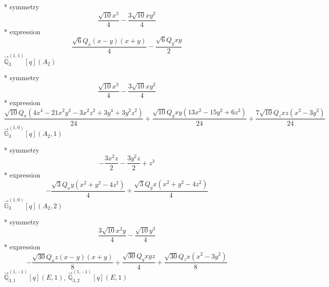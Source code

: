\documentclass[fleqn,8pt]{jsarticle}
\begin{document}
\noindent\quad ** symmetry
\begin{dmath*}
\frac{\sqrt{10} x^{3}}{4} - \frac{3 \sqrt{10} x y^{2}}{4}
\end{dmath*}
\noindent\quad ** expression
\begin{dmath*}
\frac{\sqrt{6} Q_{x} \left(x - y\right) \left(x + y\right)}{4} - \frac{\sqrt{6} Q_{y} x y}{2}
\end{dmath*}
\noindent\quad $\vec{\mathbb{Q}}_{3}^{(1,1)}[q](A_{2})$

\noindent\quad ** symmetry
\begin{dmath*}
\frac{\sqrt{10} x^{3}}{4} - \frac{3 \sqrt{10} x y^{2}}{4}
\end{dmath*}
\noindent\quad ** expression
\begin{dmath*}
\frac{\sqrt{10} Q_{x} \left(4 x^{4} - 21 x^{2} y^{2} - 3 x^{2} z^{2} + 3 y^{4} + 3 y^{2} z^{2}\right)}{24} + \frac{\sqrt{10} Q_{y} x y \left(13 x^{2} - 15 y^{2} + 6 z^{2}\right)}{24} + \frac{7 \sqrt{10} Q_{z} x z \left(x^{2} - 3 y^{2}\right)}{24}
\end{dmath*}
\noindent\quad $\vec{\mathbb{G}}_{3}^{(1,0)}[q](A_{2},1)$

\noindent\quad ** symmetry
\begin{dmath*}
- \frac{3 x^{2} z}{2} - \frac{3 y^{2} z}{2} + z^{3}
\end{dmath*}
\noindent\quad ** expression
\begin{dmath*}
- \frac{\sqrt{3} Q_{x} y \left(x^{2} + y^{2} - 4 z^{2}\right)}{4} + \frac{\sqrt{3} Q_{y} x \left(x^{2} + y^{2} - 4 z^{2}\right)}{4}
\end{dmath*}
\noindent\quad $\vec{\mathbb{G}}_{3}^{(1,0)}[q](A_{2},2)$

\noindent\quad ** symmetry
\begin{dmath*}
\frac{3 \sqrt{10} x^{2} y}{4} - \frac{\sqrt{10} y^{3}}{4}
\end{dmath*}
\noindent\quad ** expression
\begin{dmath*}
- \frac{\sqrt{30} Q_{x} z \left(x - y\right) \left(x + y\right)}{8} + \frac{\sqrt{30} Q_{y} x y z}{4} + \frac{\sqrt{30} Q_{z} x \left(x^{2} - 3 y^{2}\right)}{8}
\end{dmath*}
\noindent\quad $\vec{\mathbb{Q}}_{3,1}^{(1,-1)}[q](E,1)$, $\vec{\mathbb{Q}}_{3,2}^{(1,-1)}[q](E,1)$
\end{document}
